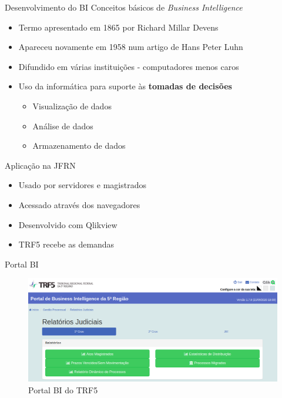 \documentclass[10pt,t]{beamer}
\begin{document}
\begin{frame}{Desenvolvimento do BI}\label{colorpalette}
\vspace{8pt}
Conceitos básicos de \textit{Business Intelligence}
    \begin{itemize}
        \item Termo apresentado em 1865 por Richard Millar Devens
        \item Apareceu novamente em 1958 num artigo de Hans Peter Luhn
    	\item Difundido em várias instituições - computadores menos caros
    	\item Uso da informática para suporte às \textbf{tomadas de decisões}
    	\begin{itemize}
    		\item Visualização de dados
    		\item Análise de dados
    		\item Armazenamento de dados
    	\end{itemize}
    \end{itemize}
\end{frame} 


\begin{frame}{Aplicação na JFRN}\label{colorpalette}
\vspace{8pt}
    \begin{itemize}
    	\item Usado por servidores e magistrados
    	\item Acessado através dos navegadores
    	\item Desenvolvido com Qlikview
    	\item TRF5 recebe as demandas
    \end{itemize}
\end{frame} 


\begin{frame}{Portal BI}\label{colorpalette}
	\vspace{8pt}
	\begin{figure}
		\centering
		\includegraphics[scale=0.25]{./imagens/portal_bi.png}
		\caption{Portal BI do TRF5}
	\end{figure}
\end{frame} 
\end{document}
